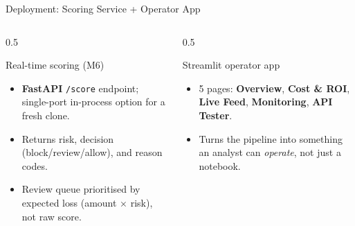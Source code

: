 \documentclass[t, aspectratio=169]{beamer} %
\begin{document}
\begin{frame}{Deployment: Scoring Service + Operator App}
	\begin{columns}[T]
		\begin{column}{0.5\textwidth}
			\begin{block}{Real-time scoring (M6)}
				\begin{itemize}
					\item \textbf{FastAPI} \texttt{/score} endpoint; single-port
					      in-process option for a fresh clone.
					\item Returns risk, decision (block/review/allow), and reason
					      codes.
					\item Review queue prioritised by \alert{expected loss}
					      (amount $\times$ risk), not raw score.
				\end{itemize}
			\end{block}
		\end{column}
		\begin{column}{0.5\textwidth}
			\begin{block}{Streamlit operator app}
				\begin{itemize}
					\item 5 pages: \textbf{Overview}, \textbf{Cost \& ROI},
					      \textbf{Live Feed}, \textbf{Monitoring},
					      \textbf{API Tester}.
					\item Turns the pipeline into something an analyst can
					      \emph{operate}, not just a notebook.
				\end{itemize}
			\end{block}
		\end{column}
	\end{columns}
\end{frame}
\end{document}
